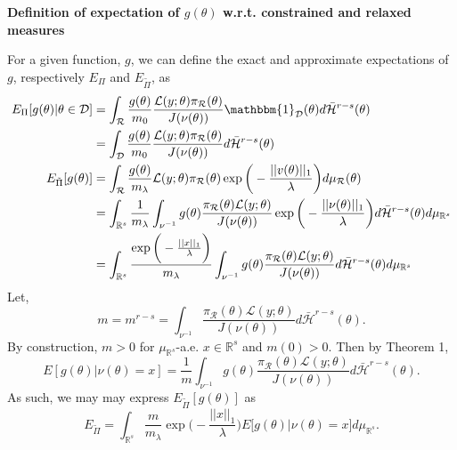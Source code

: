 \documentclass[10pt,fleqn]{article}
\DeclareMathOperator{\1}{\mathbbm{1}}
\begin{document}
{\noindent \textbf{Definition of expectation of $g(\theta)$ w.r.t. constrained and relaxed measures}

For a given function, $g$, we can define the exact and approximate expectations of $g$, respectively $E_\Pi$ and $E_{\tilde{\Pi}}$, as
\begin{align*}
E_\Pi[g(\theta)|\theta\in\mathcal{D}] &= \int_\mathcal{R} \frac{g(\theta)}{m_0} \frac{\mathcal{L}(y;\theta)\pi_\mathcal{R}(\theta)}{J(\nu(\theta))}\mathbbm{1}_\mathcal{D}(\theta)d\bar{\mathcal{H}}^{r-s}(\theta) \\
&=\int_\mathcal{D} \frac{g(\theta)}{m_0} \frac{\mathcal{L}(y;\theta)\pi_\mathcal{R}(\theta)}{J(\nu(\theta))}d\bar{\mathcal{H}}^{r-s}(\theta)\\
E_{\tilde{\Pi}}[g(\theta)] &= \int_\mathcal{R}  \frac{g(\theta)}{m_\lambda} \mathcal{L}(y;\theta)\pi_\mathcal{R}(\theta)\exp\bigg(-\frac{||v(\theta)||_1}{\lambda}\bigg)d\mu_\mathcal{R}(\theta) \\
&= \int_{\mathbb{R}^s} \frac{1}{m_\lambda} \int_{\nu^{-1}} g(\theta) \frac{\pi_\mathcal{R}(\theta)\mathcal{L}(y;\theta)}{J(\nu(\theta))} \exp\bigg(-\frac{||\nu(\theta)||_1}{\lambda}\bigg) d\bar{\mathcal{H}}^{r-s}(\theta) d\mu_{\mathbb{R}^s} \\
&=\int_{\mathbb{R}^s} \frac{\exp\bigg(-\frac{||x||_1}{\lambda}\bigg) }{m_\lambda} \int_{\nu^{-1}} g(\theta) \frac{\pi_\mathcal{R}(\theta)\mathcal{L}(y;\theta)}{J(\nu(\theta))} d\bar{\mathcal{H}}^{r-s}(\theta) d\mu_{\mathbb{R}^s} 
\end{align*}
Let, $$m = m^{r-s} = \int_{\nu^{-1}}\frac{\pi_\mathcal{R}(\theta)\mathcal{L}(y;\theta)}{J(\nu(\theta))} d\bar{\mathcal{H}}^{r-s}(\theta) .$$
By construction, $m > 0$ for $\mu_{\mathbb{R}^s}$-a.e. $x\in \mathbb{R}^s$ and $m(0)>0$. Then by Theorem 1,
\begin{equation}
E[g(\theta) | \nu(\theta) = x] = \frac{1}{m} \int_{\nu^{-1}} g(\theta)\frac{\pi_\mathcal{R}(\theta)\mathcal{L}(y;\theta)}{J(\nu(\theta))} d\bar{\mathcal{H}}^{r-s}(\theta).
\end{equation}
As such, we may may express $E_{\tilde{\Pi}}[g(\theta)]$ as 
\begin{equation}
E_{\tilde{\Pi}} = \int_{\mathbb{R}^s} \frac{m}{m_\lambda}\exp\bigg(-\frac{||x||_1}{\lambda}\bigg) E\big[g(\theta)|\nu(\theta)=x\big] d\mu_{\mathbb{R}^s}.
\end{equation}

}
\end{document}
